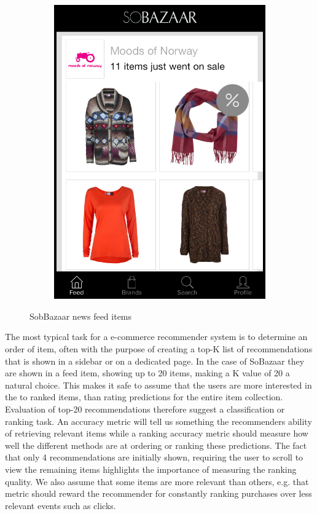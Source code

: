 \begin{figure}[H]
\begin{subfigure}[b]{.45\linewidth}
			\includegraphics[scale=0.25]{image/SoBazaarsale.png}
		\end{subfigure}
		\caption[Sobazaar News Feed - Version 0.5.1]{SobBazaar news feed items}
		\label{figure:sobazarfeed}
\end{figure}

The most typical task for a e-commerce recommender system is to determine an order of item, often with the
purpose of creating a top-K list of recommendations that is shown in a sidebar or on a dedicated page.
In the case of SoBazaar they are shown in a feed item, showing up to 20 items, making a K value of 20
a natural choice. This makes it safe to assume that the users are more interested in the to ranked items,
than rating predictions for  the entire item collection. Evaluation of top-20 recommendations therefore
suggest a classification or ranking task. An accuracy metric will tell us something the recommenders
ability of retrieving relevant items while a ranking accuracy metric should measure how well the different
methods are at ordering or ranking these predictions. The fact that only 4 recommendations are initially shown,
requiring the user to scroll to view the remaining items highlights the importance of measuring the ranking quality.
We also assume that some items are more relevant than others, e.g. that metric should reward
the recommender for constantly ranking purchases over less relevant events such as clicks.

